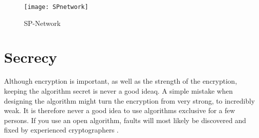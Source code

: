 \begin{figure}
  \begin{center}
    \texttt{[image: SPnetwork]}
    \caption{SP-Network}
    \label{img:SPNetwork}
  \end{center}
\end{figure}


\section{Secrecy}
Although encryption is important, as well as the strength of the encryption, 
keeping the algorithm secret is never a good ideaq. A simple mistake when 
designing the algorithm might turn the encryption from very strong, to 
incredibly weak. It is therefore never a good idea to use algorithms exclusive 
for a few persons. If you use an open algorithm, faults will most likely be 
discovered and fixed by experienced cryptographers \citep[pp. 23]{Schneier:2003}.
